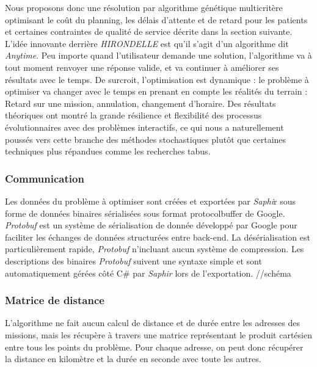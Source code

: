 \documentclass[french, 11pt]{memoir}
\begin{document}
\bigskip
Nous proposons donc une résolution par algorithme génétique multicritère
optimisant le coût du planning, les délais d'attente et de retard pour
les patients et certaines contraintes de qualité de service décrite dans
la section suivante.\\
L'idée innovante derrière \emph{HIRONDELLE} est
qu'il s'agit d'un algorithme dit \emph{Anytime}. Peu importe quand
l'utilisateur demande une solution, l'algorithme va à tout moment
renvoyer une réponse valide, et va continuer à améliorer ses résultats
avec le temps. De surcroit, l'optimisation est dynamique : le problème à
optimiser va changer avec le temps en prenant en compte les réalités du
terrain : Retard sur une mission, annulation, changement d'horaire. Des
résultats théoriques ont montré la grande résilience et flexibilité des
processus évolutionnaires avec des problèmes interactifs, ce qui nous a
naturellement poussés vers cette branche des méthodes stochastiques
plutôt que certaines techniques plus répandues comme les recherches
tabus.

\subsubsection{Communication}\label{communication}

Les données du problème à optimiser sont créées et exportées par
\emph{Saphi}r sous forme de données binaires sérialisées sous format
protocolbuffer de Google. \\
\emph{Protobuf} est un système de sérialisation
de donnée développé par Google pour faciliter les échanges de données
structurées entre back-end. La désérialisation est particulièrement
rapide, \emph{Protobuf} n'incluant aucun système de compression. Les
descriptions des binaires \emph{Protobuf} suivent une syntaxe simple et
sont automatiquement gérées côté C\# par \emph{Saphir} lors de
l'exportation. //schéma

\subsubsection{Matrice de distance}\label{matrice-de-distance}

L'algorithme ne fait aucun calcul de distance et de durée entre les
adresses des missions, mais les récupère à travers une matrice
représentant le produit cartésien entre tous les points du problème.
Pour chaque adresse, on peut donc récupérer la distance en kilomètre et
la durée en seconde avec toute les autres.
\end{document}
